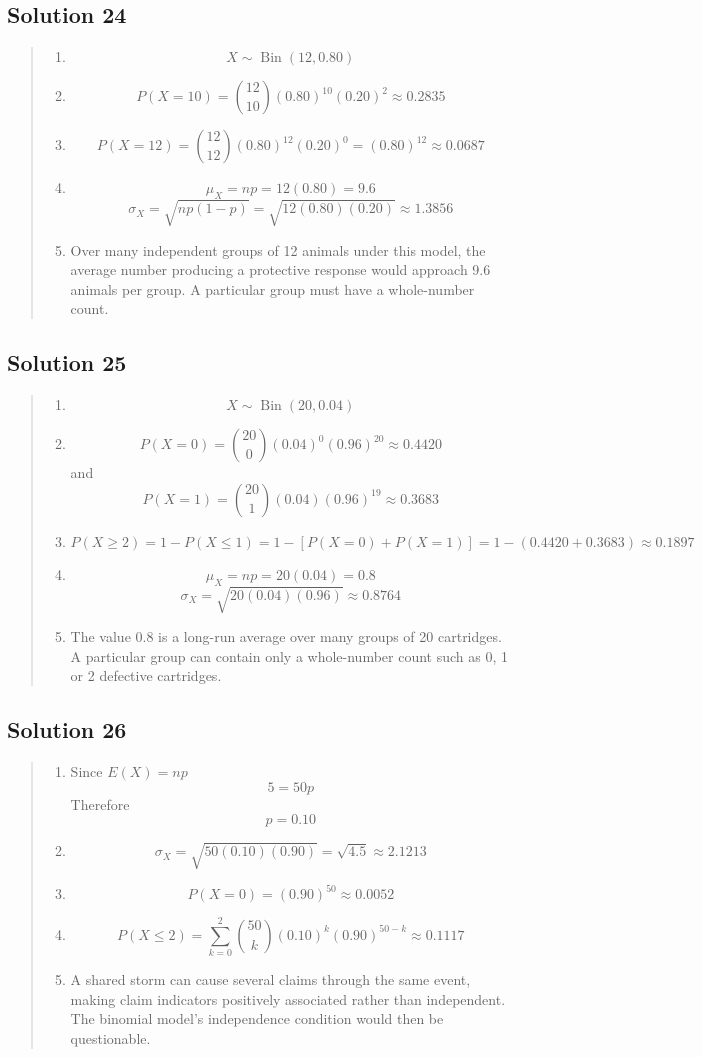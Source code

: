 \documentclass[10pt,letterpaper]{article}
\newcommand{\solutionheading}[1]{%
  \subsection*{Solution #1}
}
\newenvironment{answer}{%
  \begin{quote}\small\color{black}
}{%
  \end{quote}
}
\begin{document}
\solutionheading{24}
\begin{answer}
\begin{enumerate}
	\item
	$$X\sim\operatorname{Bin}(12,0.80)$$
  	\item
	$$P(X=10)=\binom{12}{10}(0.80)^{10}(0.20)^2\approx0.2835$$
	\item
	$$P(X=12)=\binom{12}{12}(0.80)^{12}(0.20)^0=(0.80)^{12}\approx0.0687$$
  	\item
	$$\mu_X=np=12(0.80)=9.6$$
	$$\sigma_X=\sqrt{np(1-p)}=\sqrt{12(0.80)(0.20)}\approx1.3856$$
	\item Over many independent groups of 12 animals under this model, the average number producing a protective response would approach 9.6 animals per group. A particular group must have a whole-number count.
\end{enumerate}
\end{answer}

\solutionheading{25}
\begin{answer}
\begin{enumerate}
	\item
	$$X\sim\operatorname{Bin}(20,0.04)$$
	\item
	$$P(X=0)=\binom{20}{0}(0.04)^0(0.96)^{20}\approx0.4420$$
  	and
	$$P(X=1)=\binom{20}{1}(0.04)(0.96)^{19}\approx0.3683$$
	\item
	$$P(X\geq2)=1-P(X\leq1)=1-[P(X=0)+P(X=1)]=1-(0.4420+0.3683)\approx0.1897$$
  	\item
	$$\mu_X=np=20(0.04)=0.8$$
	$$\sigma_X=\sqrt{20(0.04)(0.96)}\approx0.8764$$
	\item The value 0.8 is a long-run average over many groups of 20 cartridges. A particular group can contain only a whole-number count such as 0, 1 or 2 defective cartridges.
\end{enumerate}
\end{answer}

\solutionheading{26}
\begin{answer}
\begin{enumerate}
	\item Since $E(X)=np$
	$$5=50p$$
  	Therefore
	$$p=0.10$$
  	\item
	$$\sigma_X=\sqrt{50(0.10)(0.90)}=\sqrt{4.5}\approx2.1213$$
  	\item
	$$P(X=0)=(0.90)^{50}\approx0.0052$$
  	\item
	$$P(X\leq2)=\sum_{k=0}^{2}\binom{50}{k}(0.10)^k(0.90)^{50-k}\approx0.1117$$
	\item A shared storm can cause several claims through the same event, making claim indicators positively associated rather than independent. The binomial model's independence condition would then be questionable.
\end{enumerate}
\end{answer}
\end{document}
